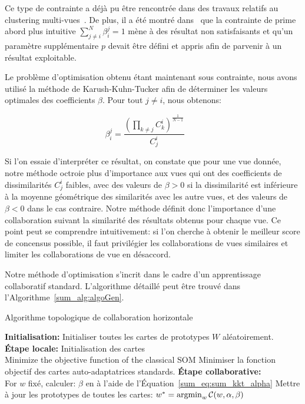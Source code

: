 Ce type de contrainte a déjà pu être rencontrée dans des travaux relatifs au clustering multi-vues~\cite{CarvalhoML15}. De plus, il a été montré dans~\cite{Sublime2017} que la contrainte de prime abord plus intuitive $\sum_{j \neq i}^N \beta^j_i = 1$ mène à des résultat non satisfaisants et qu'un paramètre supplémentaire $p$ devait être défini et appris  afin de parvenir à un résultat exploitable.

Le problème d'optimisation obtenu étant maintenant sous contrainte, nous avons utilisé la méthode de Karush-Kuhn-Tucker afin de déterminer les valeurs optimales des coefficients $\beta$. Pour tout $j \neq i$, nous obtenons:

\begin{equation}
\beta^j_i =  \frac{{(\prod_{k\neq j} C_k^i)}^{\frac 1 {N-1}}} {C_j^i} \qquad
\label{sum_eq:sum_kkt_alpha}
\end{equation} 

Si l'on essaie d'interpréter ce résultat, on constate que pour une vue donnée, notre méthode octroie plus d'importance aux vues qui ont des coefficients de dissimilarités $C_j^i$ faibles, avec des valeurs de $\beta>0$ si la dissimilarité est inférieure à la moyenne géométrique des similarités avec les autre vues, et des valeurs de $\beta<0$ dans le cas contraire. Notre méthode définit donc l'importance d'une collaboration suivant la similarité des résultats obtenus pour chaque vue. Ce point peut se comprendre intuitivement: si l'on cherche à obtenir le meilleur score de concensus possible, il faut privilégier les collaborations de vues similaires et limiter les collaborations de vue en désaccord.

Notre méthode d'optimisation s'incrit dans le cadre d'un apprentissage collaboratif standard. L'algorithme détaillé peut être trouvé dans l'Algorithme~\ref{sum_alg:algoGen}.

\begin{algorithm}[!h]
\label{sum_alg:algoGen}
\SetAlgoLined{}
	\vspace{0.05cm}
	\caption{Algorithme topologique de collaboration horizontale}
	\vspace{0.05cm}
	\textbf{Initialisation:} Initialiser toutes les cartes de prototypes $W$ aléatoirement. \\
	\textbf{Étape locale:} Initialisation des cartes\\
	 {
		Minimize the objective function of the classical SOM
        Minimiser la fonction objectif des cartes auto-adaptatrices standards.
	} 
	\textbf{Étape collaborative:}\\
	 {
        For $w$ fixé, calculer:
        $\beta$ en à l'aide de l'Équation~\ref{sum_eq:sum_kkt_alpha}
        Mettre à jour les prototypes de toutes les cartes:
		$ 
		w^{*} =  \operatornamewithlimits{argmin}_{w}\mathcal{C}(w,\alpha,\beta) 
		$
	}	 
\end{algorithm}


